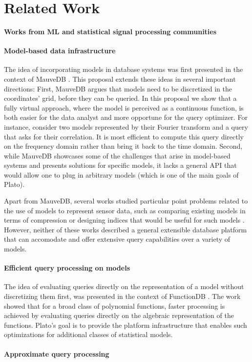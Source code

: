 \section{Related Work}

\paragraph{Works from ML and statistical signal processing communities} 

\paragraph{Model-based data infrastructure}
The idea of incorporating models in database systems was first presented in the context of MauveDB \cite{mauvedb-grid, mauvedb-cidr, mauvedb-vldb}. This proposal extends these ideas in several important directions: First, MauveDB argues that models need to be discretized in the coordinates' grid, before they can be queried. In this proposal we show that a fully virtual approach, where the model is perceived as a continuous function, is both easier for the data analyst and more opportune for the query optimizer. For instance, consider two models represented by their Fourier transform and a query that asks for their correlation. It is most efficient to compute this query directly on the frequency domain rather than bring it back to the time domain. Second, while MauveDB showcases some of the challenges that arise in model-based systems and presents solutions for specific models, it lacks a general API that would allow one to plug in arbitrary models (which is one of the main goals of Plato). 

Apart from MauveDB, several works studied particular point problems related to the use of models to represent sensor data, such as comparing existing models in terms of compression or designing indices that would be useful for such models \cite{aberer-cloud, aberer-compression}. However, neither of these works described a general extensible database platform that can accomodate and offer extensive query capabilities over a variety of models.

\paragraph{Efficient query processing on models} The idea of evaluating queries directly on the representation of a model without discretizing them first, was presented in the context of FunctionDB \cite{functiondb}. The work showed that for a broad class of polynomial functions, faster processing is achieved by evaluating queries directly on the algebraic representation of the functions. Plato's goal is to provide the platform infrastructure that enables such optimizations for additional classes of statistical models.

\paragraph{Approximate query processing}
